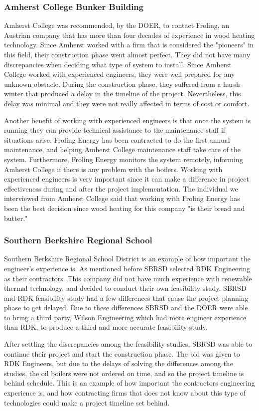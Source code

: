 \subsubsection{Amherst College Bunker Building}
\par Amherst College was recommended, by the DOER, to contact Froling, an Austrian company that has more than four decades of experience in wood heating technology. Since Amherst worked with a firm that is considered the "pioneers" in this field, their construction phase went almost perfect. They did not have many discrepancies when deciding what type of system to install. Since Amherst College worked with experienced engineers, they were well prepared for any unknown obstacle. During the construction phase, they suffered from a harsh winter that produced a delay in the timeline of the project. Nevertheless, this delay was minimal and they were not really affected in terms of cost or comfort.
\par Another benefit of working with experienced engineers is that once the system is running they can provide technical assistance to the maintenance staff if situations arise. Froling Energy has been contracted to do the first annual maintenance, and helping Amherst College maintenance staff take care of the system. Furthermore, Froling Energy monitors the system remotely, informing Amherst College if there is any problem with the boilers. Working with experienced engineers is very important since it can make a difference in project effectiveness during and after the project implementation. The individual we interviewed from Amherst College said that working with Froling Energy has been the best decision since wood heating for this company "is their bread and butter."

\subsubsection{Southern Berkshire Regional School}
\par Southern Berkshire Regional School District is an example of how important the engineer's experience is. As mentioned before SBRSD selected RDK Engineering as their contractors. This company did not have much experience with renewable thermal technology, and decided to conduct their own feasibility study. SBRSD and RDK feasibility study had a few differences that cause the project planning phase to get delayed. Due to these differences SBRSD and the DOER were able to bring a third party, Wilson Engineering which had more engineer experience than RDK, to produce a third and more accurate feasibility study.
\par After settling the discrepancies among the feasibility studies, SBRSD was able to continue their project and start the construction phase. The bid was given to RDK Engineers, but due to the delays of solving the differences among the studies, the oil boilers were not ordered on time, and so the project timeline is behind schedule. This is an example of how important the contractors engineering experience is, and how contracting firms that does not know about this type of technologies could make a project timeline set behind.

